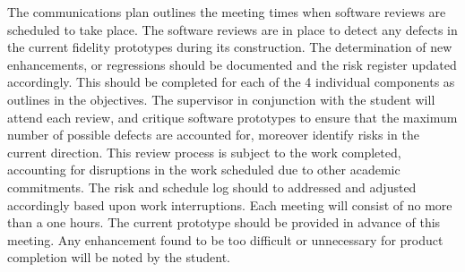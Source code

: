 		The communications plan outlines the meeting times when software reviews are scheduled to take place.
		The software reviews are in place to detect any defects in the current fidelity prototypes during its construction.  
		The determination of new enhancements, or regressions should be documented and the risk register updated accordingly.
		This should be completed for each of the 4 individual components as outlines in the objectives.  
		\newline
		\newline
		The supervisor in conjunction with the student will attend each review, and critique software prototypes to 
		ensure that the maximum number of possible defects are accounted for, moreover identify risks in the current direction.
		\newline
		\newline
		This review process is subject to the work completed, accounting for disruptions in the work scheduled due to other academic commitments.
		The risk and schedule log should to addressed and adjusted accordingly based upon work interruptions.
		Each meeting will consist of no more than a one hours.  The current	prototype should be provided in advance of this meeting.  
		Any enhancement found to be too difficult or unnecessary for product completion will be noted by the student.
		\newline
	
